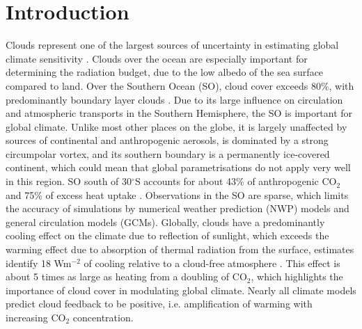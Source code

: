 \chapter{Introduction}

Clouds represent one of the largest sources of uncertainty in estimating global
climate sensitivity \citep{williams2017}. Clouds over the ocean
are especially important for determining the radiation budget, due to the
low albedo of the sea surface compared to land.
Over the Southern Ocean (SO),
cloud cover exceeds 80\%, with predominantly boundary layer clouds \citep{mace2009}.
Due to its large influence on circulation and atmospheric transports in the
Southern Hemisphere, the SO is important for global climate. Unlike
most other places on the globe, it is largely unaffected by sources of
continental and anthropogenic aerosols, is dominated by a strong circumpolar
vortex, and its southern boundary is a permanently ice-covered continent,
which could mean that global parametrisations do not apply very well in this
region.
SO south of 30$^\circ$S accounts for about 43\% of anthropogenic CO$_2$ and 75\%
of excess heat uptake \citep{frolicher2015}.
Observations in the SO are sparse, which limits the accuracy
of simulations by numerical weather prediction (NWP) models and general
circulation models (GCMs).
Globally, clouds have a predominantly cooling effect on the climate due to reflection
of sunlight, which exceeds the warming effect due to absorption of thermal
radiation from the surface, estimates identify 18 Wm$^{-2}$ of cooling relative to a cloud-free atmosphere
\citep{zelinka2017}. This effect is about 5 times as large as heating from
a doubling of CO$_2$, which highlights the importance of cloud cover in modulating
global climate. Nearly all climate models predict cloud feedback to be positive,
i.e. amplification of warming with increasing CO$_2$ concentration.

